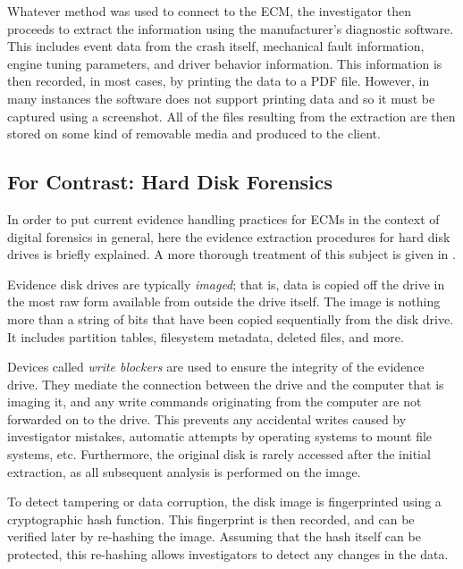 Whatever method was used to connect to the ECM, the investigator then proceeds to extract the information using the manufacturer's diagnostic
software. This includes event data from the crash itself, mechanical fault information, engine tuning parameters, and driver behavior information.
This information is then recorded, in most cases, by printing the data to a PDF file. However, in many instances the software does not support
printing data and so it must be captured using a screenshot. All of the files resulting from the extraction are then stored on some kind of
removable media and produced to the client.

\subsection{For Contrast: Hard Disk Forensics}

In order to put current evidence handling practices for ECMs in the context of digital forensics in general, here the evidence extraction
procedures for hard disk drives is briefly explained. A more thorough treatment of this subject is given in \cite{carrier2005}.

Evidence disk drives are typically \emph{imaged}; that is, data is copied off the drive in the most raw form available from outside
the drive itself. The image is nothing more than a string of bits that have been copied sequentially from the disk drive. It includes
partition tables, filesystem metadata, deleted files, and more.

Devices called \emph{write blockers} are used to ensure the integrity of the evidence drive. They mediate the connection between the
drive and the computer that is imaging it, and any write commands originating from the computer are not forwarded on to the drive.
This prevents any accidental writes caused by investigator mistakes, automatic attempts by operating systems to mount file systems, etc.
Furthermore, the original disk is rarely accessed after the initial extraction, as all subsequent analysis is performed on the image.

To detect tampering or data corruption, the disk image is fingerprinted using a cryptographic hash function. This fingerprint is then recorded,
and can be verified later by re-hashing the image. Assuming that the hash itself can be protected, this re-hashing allows investigators to
detect any changes in the data.

